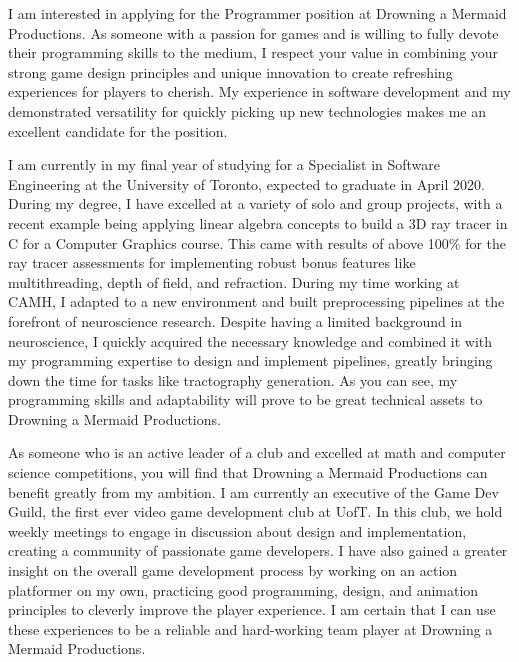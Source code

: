 \documentclass[11pt, a4paper]{awesome-cv}
\begin{document}
\makecvheader[C]


\makelettertitle

\begin{cvletter}

I am interested in applying for the Programmer position at Drowning a Mermaid Productions. As someone with a passion for games and is willing to fully devote their programming skills to the medium, I respect your value in combining your strong game design principles and unique innovation to create refreshing experiences for players to cherish. My experience in software development and my demonstrated versatility for quickly picking up new technologies makes me an excellent candidate for the position.

I am currently in my final year of studying for a Specialist in Software Engineering at the University of Toronto, expected to graduate in April 2020. During my degree, I have excelled at a variety of solo and group projects, with a recent example being applying linear algebra concepts to build a 3D ray tracer in C for a Computer Graphics course. This came with results of above 100\% for the ray tracer assessments for implementing robust bonus features like multithreading, depth of field, and refraction. During my time working at CAMH, I adapted to a new environment and built preprocessing pipelines at the forefront of neuroscience research. Despite having a limited background in neuroscience, I quickly acquired the necessary knowledge and combined it with my programming expertise to design and implement pipelines, greatly bringing down the time for tasks like tractography generation. As you can see, my programming skills and adaptability will prove to be great technical assets to Drowning a Mermaid Productions.

As someone who is an active leader of a club and excelled at math and computer science competitions, you will find that Drowning a Mermaid Productions can benefit greatly from my ambition. I am currently an executive of the Game Dev Guild, the first ever video game development club at UofT. In this club, we hold weekly meetings to engage in discussion about design and implementation, creating a community of passionate game developers. I have also gained a greater insight on the overall game development process by working on an action platformer on my own, practicing good programming, design, and animation principles to cleverly improve the player experience. I am certain that I can use these experiences to be a reliable and hard-working team player at Drowning a Mermaid Productions.


\end{cvletter}
\end{document}
